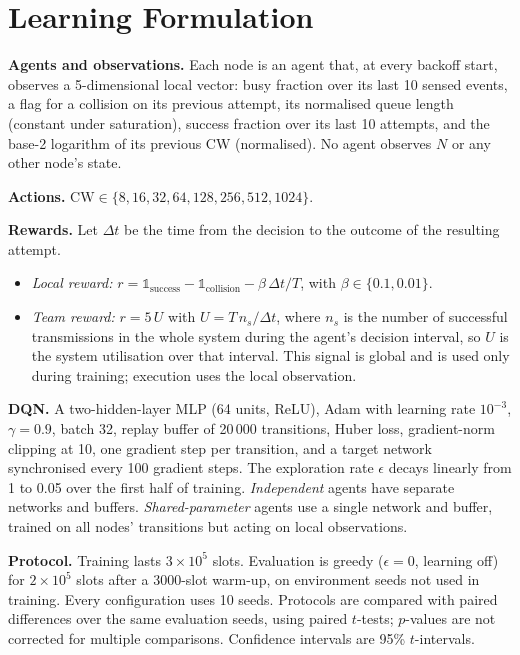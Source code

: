 \documentclass[conference]{IEEEtran}
\begin{document}
\section{Learning Formulation}\label{sec:learning}
\textbf{Agents and observations.} Each node is an agent that, at every backoff start, observes a 5-dimensional local vector: busy fraction over its last 10 sensed events, a flag for a collision on its previous attempt, its normalised queue length (constant under saturation), success fraction over its last 10 attempts, and the base-2 logarithm of its previous CW (normalised). No agent observes $N$ or any other node's state.

\textbf{Actions.} $\mathrm{CW}\in\{8,16,32,64,128,256,512,1024\}$.

\textbf{Rewards.} Let $\Delta t$ be the time from the decision to the outcome of the resulting attempt.
\begin{itemize}
\item \emph{Local reward:} $r=\mathbb{1}_{\text{success}}-\mathbb{1}_{\text{collision}}-\beta\,\Delta t/T$, with $\beta\in\{0.1,0.01\}$.
\item \emph{Team reward:} $r=5\,U$ with $U=T\,n_s/\Delta t$, where $n_s$ is the number of successful transmissions in the whole system during the agent's decision interval, so $U$ is the system utilisation over that interval. This signal is global and is used only during training; execution uses the local observation.
\end{itemize}

\textbf{DQN.} A two-hidden-layer MLP (64 units, ReLU), Adam with learning rate $10^{-3}$, $\gamma{=}0.9$, batch 32, replay buffer of 20\,000 transitions, Huber loss, gradient-norm clipping at 10, one gradient step per transition, and a target network synchronised every 100 gradient steps. The exploration rate $\epsilon$ decays linearly from 1 to 0.05 over the first half of training. \emph{Independent} agents have separate networks and buffers. \emph{Shared-parameter} agents use a single network and buffer, trained on all nodes' transitions but acting on local observations.

\textbf{Protocol.} Training lasts $3{\times}10^5$ slots. Evaluation is greedy ($\epsilon{=}0$, learning off) for $2{\times}10^5$ slots after a 3000-slot warm-up, on environment seeds not used in training. Every configuration uses 10 seeds. Protocols are compared with paired differences over the same evaluation seeds, using paired $t$-tests; $p$-values are not corrected for multiple comparisons. Confidence intervals are 95\% $t$-intervals.
\end{document}
